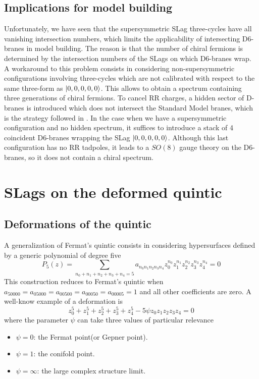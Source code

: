 \subsection{Implications for model building}
Unfortunately, we have seen that the supersymmetric SLag three-cycles have all vanishing 
intersection numbers, which limits the applicability of intersecting D$6$-branes in model building.
The reason is that the number of chiral fermions is determined by the intersection numbers 
of the SLags on which D$6$-branes wrap.
A workaround to this problem consists in considering non-supersymmetric configurations involving three-cycles
which are not calibrated with respect to the same three-form as $\ket{0,0,0,0,0}$.
This allows to obtain a spectrum containing three generations of chiral fermions.
To cancel RR charges, a hidden sector of D-branes is introduced which does not intersect the 
Standard Model branes, which is the strategy followed in \cite{Blumenhagen1}\cite{Blumenhagen2}.
In the case when we have a supersymmetric configuration and no hidden spectrum, it suffices to introduce a stack of 4 coincident
D6-branes wrapping the SLag $\ket{0,0,0,0,0}$. Although this last configuration has no RR tadpoles, 
it leads to a $SO(8)$ gauge theory on the D6-branes, so it does not contain a chiral spectrum.

\section{SLags on the deformed quintic}

\subsection{Deformations of the quintic}

A generalization of Fermat's quintic consists in considering hypersurfaces defined by a generic polynomial of degree five
\begin{equation}
  P_5(z)=\sum_{n_0+n_1+n_2+n_3+n_4=5} a_{n_0 n_1 n_2 n_3 n_4} z_0^{n_0}z_1^{n_1}z_2^{n_2}z_3^{n_3}z_4^{n_4}=0
\end{equation}
This construction reduces to Fermat's quintic when $a_{50000}=a_{05000}=a_{00500}=a_{00050}=a_{00005}=1$ and all other coefficients are zero.
A well-know example of a deformation is
\begin{equation}
  z_0^5+z_1^5+z_2^5+z_3^5+z_4^5- 5\psi z_0z_1z_2z_3z_4=0
\end{equation}
 where the parameter $\psi$ can take three values of particular relevance
\begin{itemize}
  \item $\psi=0$: the Fermat point(or Gepner point).
  \item $\psi=1$: the conifold point.
  \item $\psi=\infty$: the large complex structure limit.
\end{itemize}

